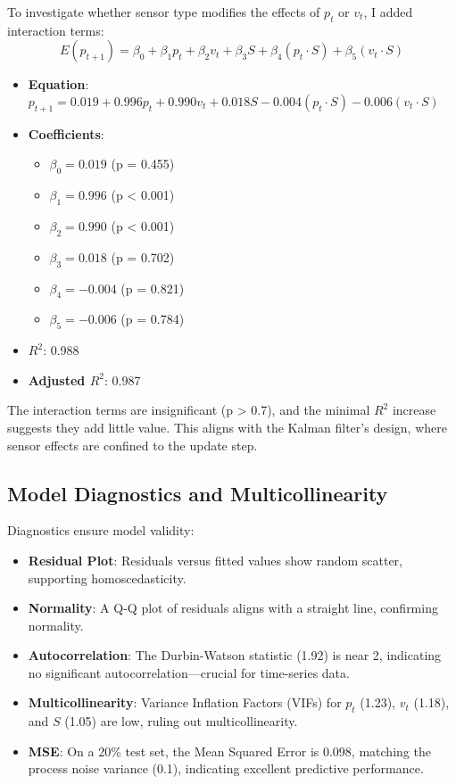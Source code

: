 \documentclass[12pt]{article}
\begin{document}
To investigate whether sensor type modifies the effects of \( p_t \) or \( v_t \), I added interaction terms:
\[
E(p_{t+1}) = \beta_0 + \beta_1 p_t + \beta_2 v_t + \beta_3 S + \beta_4 (p_t \cdot S) + \beta_5 (v_t \cdot S)
\]
\begin{itemize}
    \item \textbf{Equation}: \( p_{t+1} = 0.019 + 0.996 p_t + 0.990 v_t + 0.018 S - 0.004 (p_t \cdot S) - 0.006 (v_t \cdot S) \)
    \item \textbf{Coefficients}:
    \begin{itemize}
        \item \( \beta_0 = 0.019 \) (p = 0.455)
        \item \( \beta_1 = 0.996 \) (p < 0.001)
        \item \( \beta_2 = 0.990 \) (p < 0.001)
        \item \( \beta_3 = 0.018 \) (p = 0.702)
        \item \( \beta_4 = -0.004 \) (p = 0.821)
        \item \( \beta_5 = -0.006 \) (p = 0.784)
    \end{itemize}
    \item \textbf{\( R^2 \)}: 0.988
    \item \textbf{Adjusted \( R^2 \)}: 0.987
\end{itemize}

The interaction terms are insignificant (p > 0.7), and the minimal \( R^2 \) increase suggests they add little value. This aligns with the Kalman filter’s design, where sensor effects are confined to the update step.

\subsection{Model Diagnostics and Multicollinearity}
\label{subsec:diagnostics}

Diagnostics ensure model validity:
\begin{itemize}
    \item \textbf{Residual Plot}: Residuals versus fitted values show random scatter, supporting homoscedasticity.
    \item \textbf{Normality}: A Q-Q plot of residuals aligns with a straight line, confirming normality.
    \item \textbf{Autocorrelation}: The Durbin-Watson statistic (1.92) is near 2, indicating no significant autocorrelation—crucial for time-series data.
    \item \textbf{Multicollinearity}: Variance Inflation Factors (VIFs) for \( p_t \) (1.23), \( v_t \) (1.18), and \( S \) (1.05) are low, ruling out multicollinearity.
    \item \textbf{MSE}: On a 20\% test set, the Mean Squared Error is 0.098, matching the process noise variance (0.1), indicating excellent predictive performance.
\end{itemize}
\end{document}
